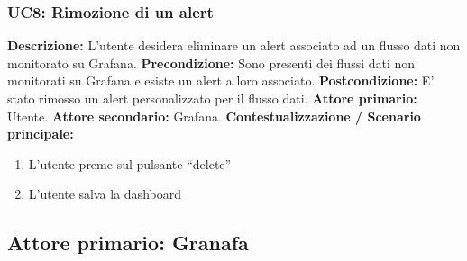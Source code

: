                 \subsubsection{UC8: Rimozione di un alert}
                    \textbf{Descrizione:}  L’utente desidera eliminare un alert associato ad un flusso dati non monitorato su Grafana.
                    \newline
                    \textbf{Precondizione:} Sono presenti dei flussi dati non monitorati su Grafana e esiste un alert a loro associato.
                    \newline
                    \textbf{Postcondizione:} E’ stato rimosso un alert personalizzato per il flusso dati.
                    \newline
                    \textbf{Attore primario:} Utente.
                    \newline
                    \textbf{Attore secondario:} Grafana.
                    \newline
                    \textbf{Contestualizzazione / Scenario principale:} \begin{enumerate}
                            \item L’utente preme sul pulsante “delete”
                            \item L’utente salva la dashboard
                        \end{enumerate}
				
		\subsection{Attore primario: Granafa}	
		
